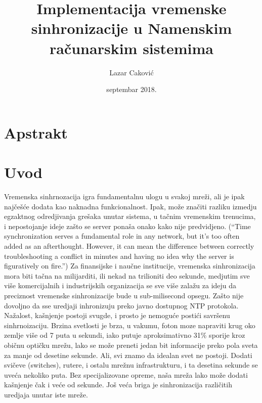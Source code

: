 \documentclass[a4paper,12pt, master]{etf}
\title{Implementacija vremenske sinhronizacije u Namenskim ra\v{c}unarskim sistemima}
\author{Lazar Caković}
\date{septembar 2018.}
\begin{document}
	\maketitle

	\tableofcontents

	\listoffigures

	\newpage

	\chapter{Apstrakt}

	\newpage

	\chapter{Uvod}

	Vremenska sinhrnozacija igra fundamentalnu ulogu u svakoj mre\v{z}i, ali je ipak naj\v{c}e\v{s}\'{c}e
	dodata kao naknadna funkcionalnost. Ipak, mo\v{z}e zna\v{c}iti razliku izmedju egzaktnog
	odredjivanja gre\v{s}aka unutar sistema, u ta\v{c}nim vremenskim trenucima, i nepostojanje ideje
	za\v{s}to se server pona\v{s}a onako kako nije predvidjeno. (``Time synchronization
	serves a fundamental role in any network, but it's too often added as an afterthought.
	However, it can mean the difference between correctly troubleshooting a conflict in
	minutes and having no idea why the server is figuratively on fire.'') Za finansijske i
	nau\v{c}ne institucije, vremenska sinhronizacija mora biti ta\v{c}na na milijarditi, ili nekad na
	trilioniti deo sekunde, medjutim sve vi\v{s}e komercijalnih i industrijskih organizacija se
	sve vi\v{s}e zala\v{z}u za ideju da preciznost vremenske sinhronizacije bude u sub-milisecond
	opsegu.	Za\v{s}to nije dovoljno da sse uredjaji inhronizuju preko javno dostupnog NTP
	protokola. Na\v{z}alost, ka\v{s}njenje postoji svugde, i prosto je nemogu\'{c}e posti\'{c}i savr\v{s}enu
	sinhrnoizaciju. Brzina svetlosti je brza, u vakumu, foton moze napraviti krug oko zemlje
	vi\v{s}e od 7 puta u sekundi, iako putuje aproksimativno 31\% sporije kroz obi\v{c}nu opti\v{c}ku
	mre\v{z}u, lako se mo\v{z}e preneti jedan bit informacije preko pola sveta za manje od desetine
	sekunde. Ali, svi znamo da idealan svet ne postoji. Dodati svi\v{c}eve (switches),
	rutere, i ostalu mre\v{z}nu infrastrukturu, i ta desetina sekunde se uve\'{c}a nekoliko puta. Bez
        specijalizovane opreme, na\v{s}a mre\v{z}a lako mo\v{z}e dodati ka\v{s}njenje \v{c}ak i ve\'{c}e od
	sekunde. Jo\v{s} ve\'{c}a briga je sinhronizacija razli\v{c}itih uredjaja unutar iste mre\v{z}e.
\end{document}
